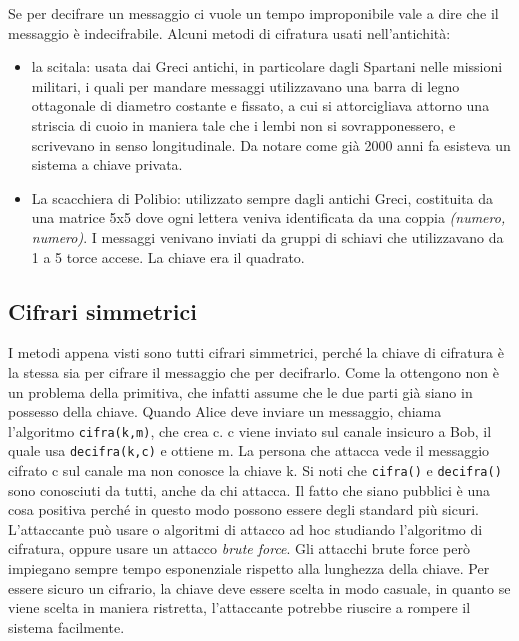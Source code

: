 Se per decifrare un messaggio ci vuole un tempo improponibile vale a dire che il messaggio è indecifrabile.
Alcuni metodi di cifratura usati nell'antichità:
\begin{itemize}
    \item la scitala: usata dai Greci antichi, in particolare dagli Spartani nelle missioni militari, i quali per mandare messaggi utilizzavano una barra di legno ottagonale di diametro costante e fissato, a cui si attorcigliava attorno una striscia di cuoio in maniera tale che i lembi non si sovrapponessero, e scrivevano in senso longitudinale. Da notare come già 2000 anni fa esisteva un sistema a chiave privata.
    \item La scacchiera di Polibio: utilizzato sempre dagli antichi Greci, costituita da una matrice 5x5 dove ogni lettera veniva identificata da una coppia \textit{(numero, numero)}. I messaggi venivano inviati da gruppi di schiavi che utilizzavano da 1 a 5 torce accese. La chiave era il quadrato.
\end{itemize}

\subsection{Cifrari simmetrici}
I metodi appena visti sono tutti cifrari simmetrici, perché la chiave di cifratura è la stessa sia per cifrare il messaggio che per decifrarlo. Come la ottengono non è un problema della primitiva, che infatti assume che le due parti già siano in possesso della chiave. Quando Alice deve inviare un messaggio, chiama l’algoritmo \texttt{cifra(k,m)}, che crea c. c viene inviato sul canale insicuro a Bob, il quale usa \texttt{decifra(k,c)} e ottiene m. La persona che attacca vede il messaggio cifrato c sul canale ma non conosce la chiave k. Si noti che \texttt{cifra()} e \texttt{decifra()} sono conosciuti da tutti, anche da chi attacca.
Il fatto che siano pubblici è una cosa positiva perché in questo modo possono essere degli standard più sicuri. L’attaccante può usare o algoritmi di attacco ad hoc studiando l'algoritmo di cifratura, oppure usare un attacco \textit{brute force}. Gli attacchi brute force però impiegano sempre tempo esponenziale rispetto alla lunghezza della chiave. Per essere sicuro un cifrario, la chiave deve essere scelta in modo casuale, in quanto se viene scelta in maniera ristretta, l'attaccante potrebbe riuscire a rompere il sistema facilmente.

\vspace{5mm}

